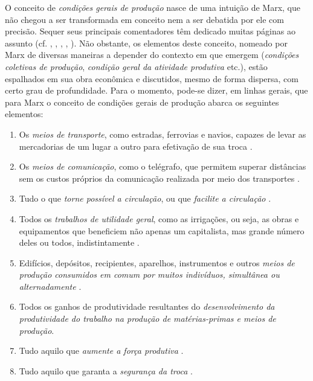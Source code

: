 O conceito de \textit{condições gerais de produção} nasce de uma intuição de Marx, que não chegou a ser transformada em conceito nem a ser debatida por ele com precisão. Sequer seus principais comentadores têm dedicado muitas páginas ao assunto (cf. , , , , ). Não obstante, os elementos deste conceito, nomeado por Marx de diversas maneiras a depender do contexto em que emergem (\textit{condições coletivas de produção}, \textit{condição geral da atividade produtiva} etc.), estão espalhados em sua obra econômica e discutidos, mesmo de forma dispersa, com certo grau de profundidade. Para o momento, pode-se dizer, em linhas gerais, que para Marx o conceito de condições gerais de produção abarca os seguintes elementos:

\begin{enumerate}
\item Os \textit{meios de transporte}, como estradas, ferrovias e navios, capazes de levar as mercadorias de um lugar a outro para efetivação de sua troca \cite[p.~522]{MARX2013}.
\item Os \textit{meios de comunicação}, como o telégrafo, que permitem superar distâncias sem os custos próprios da comunicação realizada por meio dos transportes \cite[p.~457-458]{MARX2013}.
\item Tudo o que \textit{torne possível a circulação}, ou que \textit{facilite a circulação} \cite[p.~438]{MARX2011}.
\item Todos os \textit{trabalhos de utilidade geral}, como as irrigações, ou seja, as obras e equipamentos que beneficiem não apenas um capitalista, mas grande número deles ou todos, indistintamente \cite[p.~438]{MARX2011}.
\item Edifícios, depósitos, recipientes, aparelhos, instrumentos e outros \textit{meios de produção consumidos em comum por muitos indivíduos, simultânea ou alternadamente} \cite[p.~399-400]{MARX2013}.
\item Todos os ganhos de produtividade resultantes do \textit{desenvolvimento da produtividade do trabalho na produção de matérias-primas e meios de produção}.
\item Tudo aquilo que \textit{aumente a força produtiva} \cite[p.~114]{MARX2008}.
\item Tudo aquilo que garanta a \textit{segurança da troca} \cite[p.~432-433]{MARX2011}.
\end{enumerate}

